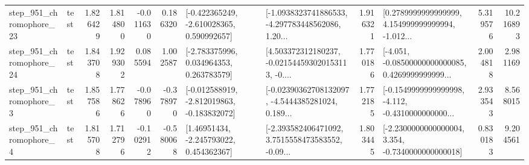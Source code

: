 \begin{tabular}{llrrrrllrlrr}
  step\_951\_chromophore\_23 &      test &      1.826429 &    1.814800 &     -0.011630 &  0.186320 &   [-0.422365249, -2.610028365, 0.590992657] &  [-1.0938323741886533, -4.297783448562086, 1.20... &       1.916321 &  [0.2789999999999999, 4.154999999999994, -1.012... &            5.319576 &         10.216893 \\
  step\_951\_chromophore\_24 &      test &      1.843708 &    1.929302 &      0.085594 &  1.002587 &    [-2.783375996, 0.034964353, 0.263783579] &  [4.503372312180237, -0.021544593020153113, -0.... &       1.770186 &  [-4.051, -0.08500000000000085, 0.4269999999999... &            2.004818 &          2.981169 \\
   step\_951\_chromophore\_3 &      test &      1.857586 &    1.778626 &     -0.078960 & -0.378970 &  [-0.012588919, -2.812019863, -0.183832072] &  [-0.02390362708132097, -4.5444385281024, 0.189... &       1.772185 &  [-0.1549999999999998, -4.112, -0.4310000000000... &            2.933543 &          8.568015 \\
   step\_951\_chromophore\_4 &      test &      1.815708 &    1.712796 &     -0.102912 & -0.580068 &     [1.46951434, -2.245793022, 0.454362367] &  [-2.393582406471092, 3.7515558473583552, -0.09... &       1.803445 &  [-2.2300000000000004, 3.354, -0.7340000000000018] &            0.830183 &          9.204561 \\
\bottomrule
\end{tabular}

